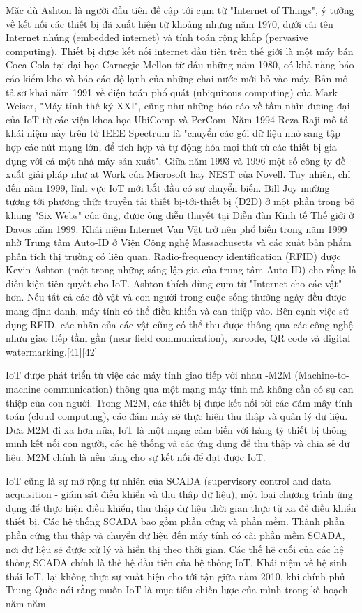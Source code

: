 Mặc dù Ashton là người đầu tiên đề cập tới cụm từ "Internet of Things", ý tưởng về kết nối các thiết bị đã xuất hiện từ khoảng những năm 1970, dưới cái tên Internet nhúng (embedded internet) và tính toán rộng khắp (pervasive computing). Thiết bị được kết nối internet đầu tiên trên thế giới là một máy bán Coca-Cola tại đại học Carnegie Mellon từ đầu những năm 1980, có khả năng báo cáo kiểm kho và báo cáo độ lạnh của những chai nước mới bỏ vào máy. 
Bản mô tả sơ khai năm 1991 về điện toán phổ quát (ubiquitous computing) của Mark Weiser, "Máy tính thế kỷ XXI", cũng như những báo cáo về tầm nhìn đương đại của IoT từ các viện khoa học UbiComp và PerCom. Năm 1994 Reza Raji mô tả khái niệm này trên tờ IEEE Spectrum là "chuyển các gói dữ liệu nhỏ sang tập hợp các nút mạng lớn, để tích hợp và tự động hóa mọi thứ từ các thiết bị gia dụng với cả một nhà máy sản xuất". Giữa năm 1993 và 1996 một số công ty đề xuất giải pháp như at Work của Microsoft hay NEST của Novell.  Tuy nhiên, chỉ đến năm 1999, lĩnh vực IoT mới bắt đầu có sự chuyển biến. Bill Joy mường tượng tới phương thức truyền tải thiết bị-tới-thiết bị (D2D) ở một phần trong bộ khung "Six Webs" của ông, được ông diễn thuyết tại Diễn đàn Kinh tế Thế giới ở Davos năm 1999. Khái niệm Internet Vạn Vật trở nên phổ biến trong năm 1999 nhờ Trung tâm Auto-ID ở Viện Công nghệ Massachusetts và các xuất bản phẩm phân tích thị trường có liên quan. Radio-frequency identification (RFID) được Kevin Ashton (một trong những sáng lập gia của trung tâm Auto-ID) cho rằng là điều kiện tiên quyết cho IoT. Ashton thích dùng cụm từ "Internet cho các vật" hơn. Nếu tất cả các đồ vật và con người trong cuộc sống thường ngày đều được mang định danh, máy tính có thể điều khiển và can thiệp vào. Bên cạnh việc sử dụng RFID, các nhãn của các vật cũng có thể thu được thông qua các công nghệ nhưu giao tiếp tầm gần (near field communication), barcode, QR code và digital watermarking.[41][42]

IoT được phát triển từ việc các máy tính giao tiếp với nhau -M2M (Machine-to-machine communication) thông qua một mạng máy tính mà không cần có sự can thiệp của con người. Trong M2M, các thiết bị được kết nối tới các đám mây tính toán (cloud computing), các đám mây sẽ thực hiện thu thập và quản lý dữ liệu. Đưa M2M đi xa hơn nữa, IoT là một mạng cảm biến với hàng tỷ thiết bị thông minh kết nối con người, các hệ thống và các ứng dụng để thu thập và chia sẻ dữ liệu. M2M chính là nền tảng cho sự kết nối để đạt được IoT.

IoT cũng là sự mở rộng tự nhiên của SCADA (supervisory control and data acquisition - giám sát điều khiển và thu thập dữ liệu), một loại chương trình ứng dụng để thực hiện điều khiển, thu thập dữ liệu thời gian thực từ xa để điều khiển thiết bị. Các hệ thống SCADA  bao gồm phần cứng và phần mềm. Thành phần phần cứng thu thập và chuyển dữ liệu đến máy tính có cài phần mềm SCADA, nơi dữ liệu sẽ được xử lý và hiển thị theo thời gian. Các thế hệ cuối của các hệ thống SCADA chính là thế hệ đầu tiên của hệ thống IoT. 
Khái niệm về hệ sinh thái IoT, lại không thực sự xuất hiện cho tới tận giữa năm 2010, khi chính phủ Trung Quốc nói rằng muốn IoT là mục tiêu chiến lược của mình trong kế hoạch năm năm.


